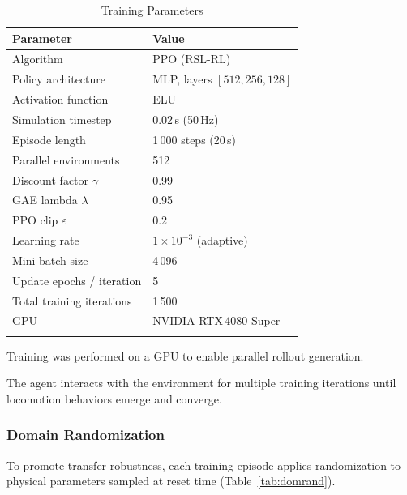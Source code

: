 \documentclass[pdflatex,sn-mathphys-num]{sn-jnl}%
\theoremstyle{thmstyleone}%
\theoremstyle{thmstyletwo}%
\theoremstyle{thmstylethree}%
\begin{document}
\begin{table}[ht]
    \caption{Training Parameters}\label{tab1}%
    \begin{tabular}{@{}l l@{}}
        \toprule
            Parameter & Value \\
        \midrule
            Algorithm                       & PPO (RSL-RL) \\
            Policy architecture             & MLP, layers $[512, 256, 128]$ \\
            Activation function             & ELU \\
            Simulation timestep             & 0.02\,s (50\,Hz) \\
            Episode length                  & 1\,000 steps (20\,s) \\
            Parallel environments           & 512 \\
            Discount factor $\gamma$        & 0.99 \\
            GAE lambda $\lambda$            & 0.95 \\
            PPO clip $\varepsilon$          & 0.2 \\
            Learning rate                   & $1\times10^{-3}$ (adaptive) \\
            Mini-batch size                 & 4\,096 \\
            Update epochs / iteration       & 5 \\
            Total training iterations       & 1\,500 \\
            GPU                             & NVIDIA RTX\,4080 Super \\
        \botrule
    \end{tabular}
\end{table}

Training was performed on a GPU to enable parallel rollout generation.

The agent interacts with the environment for multiple training iterations until locomotion behaviors emerge and converge.

\subsubsection*{Domain Randomization}

To promote transfer robustness, each training episode applies randomization to
physical parameters sampled at reset time (Table~\ref{tab:domrand}).
\end{document}
